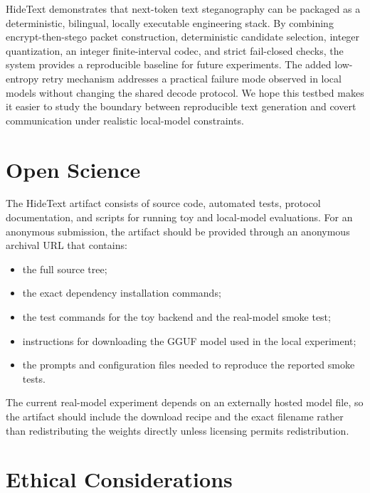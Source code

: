 \documentclass[sigconf,review,anonymous]{acmart}
\begin{document}
HideText demonstrates that next-token text steganography can be packaged as a deterministic, bilingual, locally executable engineering stack. By combining encrypt-then-stego packet construction, deterministic candidate selection, integer quantization, an integer finite-interval codec, and strict fail-closed checks, the system provides a reproducible baseline for future experiments. The added low-entropy retry mechanism addresses a practical failure mode observed in local models without changing the shared decode protocol. We hope this testbed makes it easier to study the boundary between reproducible text generation and covert communication under realistic local-model constraints.




\appendix

\section{Open Science}

The HideText artifact consists of source code, automated tests, protocol documentation, and scripts for running toy and local-model evaluations. For an anonymous submission, the artifact should be provided through an anonymous archival URL that contains:

\begin{itemize}
    \item the full source tree;
    \item the exact dependency installation commands;
    \item the test commands for the toy backend and the real-model smoke test;
    \item instructions for downloading the GGUF model used in the local experiment;
    \item the prompts and configuration files needed to reproduce the reported smoke tests.
\end{itemize}

The current real-model experiment depends on an externally hosted model file, so the artifact should include the download recipe and the exact filename rather than redistributing the weights directly unless licensing permits redistribution.

\section{Ethical Considerations}
\end{document}

